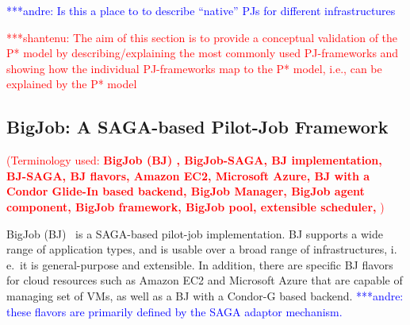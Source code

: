 \documentclass[conference,final]{IEEEtran}
\newcommand{\terminology}[1]{ {\textcolor{red} {(Terminology used: \textbf{#1}) }}}
\newcommand{\jhanote}[1]{ {\textcolor{red} { ***shantenu: #1 }}}
\newcommand{\alnote}[1]{ {\textcolor{blue} { ***andre: #1 }}}
\newcommand{\terminology}[1]{}
\newcommand{\alnote}[1]{}
\newcommand{\jhanote}[1]{}
\newcommand{\upp}{\vspace*{-0.5em}}
\begin{document}
\alnote{Is this a place to to describe ``native'' PJs for different 
infrastructures}

\jhanote{The aim of this section is to provide a conceptual validation
  of the P* model by describing/explaining the most commonly used
  PJ-frameworks and showing how the individual PJ-frameworks map to
  the P* model, i.e., can be explained by the P* model}

\subsection{BigJob: A SAGA-based Pilot-Job Framework\upp\upp}
\label{sec:bigjob_description}
\terminology{BigJob (BJ) , BigJob-SAGA, BJ implementation, BJ-SAGA, BJ
  flavors, Amazon EC2, Microsoft Azure, BJ with a Condor Glide-In
  based backend, BigJob Manager, BigJob agent component, BigJob
  framework, BigJob pool, extensible scheduler, }









BigJob (BJ)~\cite{bigjob_web,saga_bigjob_condor_cloud} is a SAGA-based pilot-job
implementation. BJ supports a wide range of application types, and is usable
over a broad range of infrastructures, i.\,e.\ it is general-purpose and
extensible. In addition, there are specific BJ flavors for cloud resources such
as Amazon EC2 and Microsoft Azure that are capable of managing set of VMs, as
well as a BJ with a Condor-G based backend. \alnote{these flavors are primarily 
defined by the SAGA adaptor mechanism.}
\end{document}
